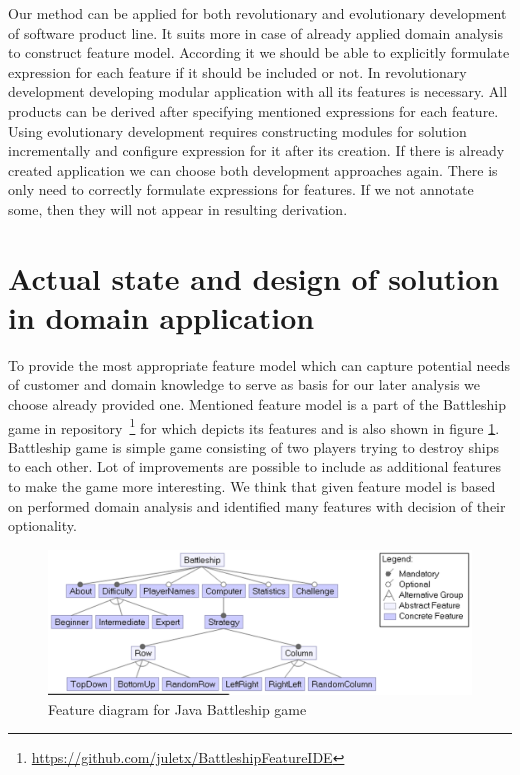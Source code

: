 \documentclass[11pt,english,a4paper,twoside]{article}
\begin{document}
Our method can be applied for both revolutionary and evolutionary development of software product line. It suits more in case of already applied domain analysis to construct feature model. According it we should be able to explicitly formulate expression for each feature if it should be included or not. In revolutionary development developing modular application with all its features is necessary. All products can be derived after specifying mentioned expressions for each feature. Using evolutionary development requires constructing modules for solution incrementally and configure expression for it after its creation. If there is already created application we can choose both development approaches again. There is only need to correctly formulate expressions for features. If we not annotate some, then they will not appear in resulting derivation.

			
\section{Actual state and design of solution in domain application} \label{actualGameState}

To provide the most appropriate feature model which can capture potential needs of customer and domain knowledge to serve as basis for our later analysis we choose already provided one. Mentioned feature model is a part of the Battleship game in repository~\footnote{\url{https://github.com/juletx/BattleshipFeatureIDE}} for which depicts its features and is also shown in figure \ref{battleshipFeatureModel}. Battleship game is simple game consisting of two players trying to destroy ships to each other. Lot of improvements are possible to include as additional features to make the game more interesting. We think that given feature model is based on performed domain analysis and identified many features with decision of their optionality.


\begin{figure}[H]  %
					\begin{center}
									\includegraphics[width=\linewidth]{fig/battleshipFeatureModel.png}
									\caption{Feature diagram for Java Battleship game}
									\label{battleshipFeatureModel}
					\end{center}
\end{figure}
\end{document}
